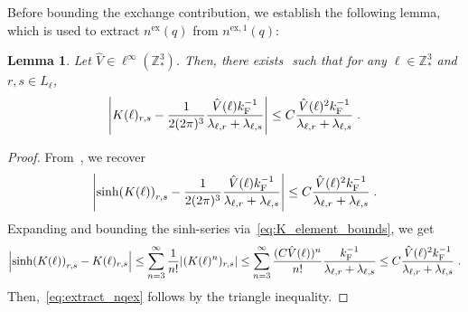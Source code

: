 \documentclass[12pt,a4paper]{article}
\numberwithin{equation}{section}
\newcommand{\1}{\mathbb{I}}
\newcommand{\ex}{\mathrm{ex}}
\newcommand{\F}{\mathrm{F}}
\newcommand{\Z}{\mathbb{Z}}
\theoremstyle{plain}
\newtheorem{lemma}[theorem]{Lemma}
\theoremstyle{definition}
\theoremstyle{remark}
\theoremstyle{plain}
\theoremstyle{definition}
\theoremstyle{remark}
\begin{document}
Before bounding the exchange contribution, we establish the following lemma, which is used to extract $ n^{\ex}(q) $ from $ n^{\ex,1}(q) $:
\begin{lemma} \label{lem:extract_nqex}
Let $ \hat{V} \in \ell^\infty(\Z^3_*) $. Then, there exists $  $ such that for any $ \ell \in \Z^3_* $ and $ r,s \in L_\ell $,
\begin{equation} \label{eq:extract_nqex}
	\abs{K(\ell)_{r,s} - \frac{1}{2 (2 \pi)^3} \frac{\hat{V}(\ell) k_{\F}^{-1}}{\lambda_{\ell,r} + \lambda_{\ell,s}}}
	\leq C \frac{\hat{V}(\ell)^2 k_{\F}^{-1}}{\lambda_{\ell,r} + \lambda_{\ell,s}} \;.
\end{equation}
\end{lemma}
\begin{proof}
From~\cite[Prop.~3.10]{CHN24}, we recover
\begin{equation}
	\abs{\sinh(K(\ell))_{r,s} - \frac{1}{2 (2 \pi)^3} \frac{\hat{V}(\ell) k_{\F}^{-1}}{\lambda_{\ell,r} + \lambda_{\ell,s}}}
	\leq C \frac{\hat{V}(\ell)^2 k_{\F}^{-1}}{\lambda_{\ell,r} + \lambda_{\ell,s}} \;.
\end{equation}
Expanding and bounding the sinh-series via~\eqref{eq:K_element_bounds}, we get
\begin{equation}
	\abs{\sinh(K(\ell))_{r,s} - K(\ell)_{r,s}}
	\le \sum_{n = 3}^\infty \frac{1}{n!} |(K(\ell)^n)_{r,s}|
	\le \sum_{n = 3}^\infty \frac{(C \hat{V}(\ell))^n}{n!}
		\frac{k_{\F}^{-1}}{\lambda_{\ell,r} + \lambda_{\ell,s}}
	\le C \frac{\hat{V}(\ell)^2 k_{\F}^{-1}}{\lambda_{\ell,r} + \lambda_{\ell,s}} \;.
\end{equation}
Then,~\eqref{eq:extract_nqex} follows by the triangle inequality.
\end{proof}
\end{document}
